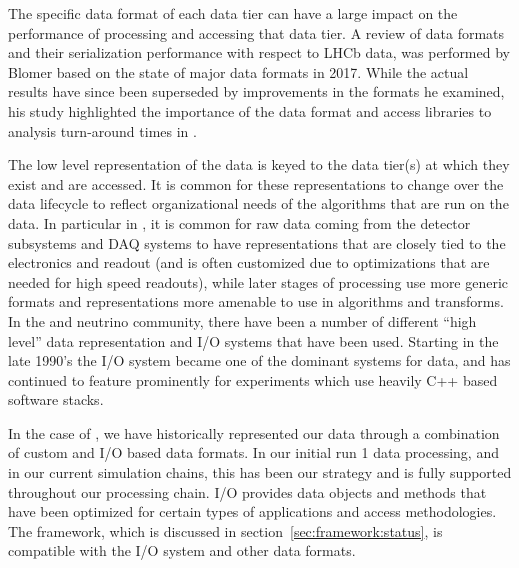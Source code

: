 \documentclass[../main-v1.tex]{subfiles}
\begin{document}
The specific data format of each data tier can have a large impact on the performance of processing and accessing that data tier.
A review of data formats and their serialization performance with respect to LHCb data, was performed by Blomer based on the state of major data formats in 2017\cite{Blomer:2018icl}.  While the actual results have since been superseded by improvements in the formats he examined, his study
highlighted the importance of the data format and access libraries to analysis turn-around times in .

The low level representation of the  data is keyed to the data tier(s) at which they exist and are accessed.  It is common for these representations to change over the data lifecycle to reflect organizational needs of the algorithms that are run on the data.  In particular in , it is common for raw data coming from the detector subsystems and DAQ systems to have representations that are closely tied to the electronics and readout (and is often customized due to optimizations that are needed for high speed readouts), while later stages of processing use more generic formats and representations more amenable to use in algorithms and transforms.  In the  and neutrino community, there have been a number of different ``high level'' data representation and I/O systems that have been used.  Starting in the late 1990's the  I/O system became one of the dominant systems for  data, and has continued to feature prominently for experiments which use heavily C++ based software stacks.  

In the case of , we have historically represented our data through a combination of custom and  I/O based data formats.  In our initial  run 1 data processing, and in our current simulation chains, this has been our strategy and is fully supported throughout our processing chain.   I/O provides data objects and methods that have been optimized for certain types of  applications and access methodologies.  The  framework, which is discussed in section~\ref{sec:framework:status}, is compatible with the  I/O system and other data formats.
\end{document}
